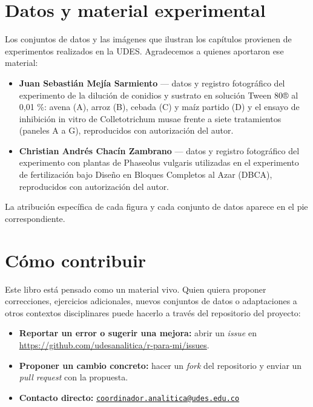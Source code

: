 \documentclass[
  spanish,
  letterpaper,
  DIV=11,
  numbers=noendperiod]{scrreprt}
\providecommand{\tightlist}{%
  \setlength{\itemsep}{0pt}\setlength{\parskip}{0pt}}
\begin{document}
\section*{Datos y material
experimental}\label{datos-y-material-experimental}


Los conjuntos de datos y las imágenes que ilustran los capítulos
provienen de experimentos realizados en la UDES. Agradecemos a quienes
aportaron ese material:

\begin{itemize}
\tightlist
\item
  \textbf{Juan Sebastián Mejía Sarmiento} --- datos y registro
  fotográfico del experimento de la dilución de conidios y sustrato en
  solución Tween 80® al 0,01 \%: avena (A), arroz (B), cebada (C) y maíz
  partido (D) y el ensayo de inhibición in vitro de Colletotrichum musae
  frente a siete tratamientos (paneles A a G), reproducidos con
  autorización del autor.
\item
  \textbf{Christian Andrés Chacín Zambrano} --- datos y registro
  fotográfico del experimento con plantas de Phaseolus vulgaris
  utilizadas en el experimento de fertilización bajo Diseño en Bloques
  Completos al Azar (DBCA), reproducidos con autorización del autor.
\end{itemize}

La atribución específica de cada figura y cada conjunto de datos aparece
en el pie correspondiente.

\section*{Cómo contribuir}\label{cuxf3mo-contribuir}


Este libro está pensado como un material vivo. Quien quiera proponer
correcciones, ejercicios adicionales, nuevos conjuntos de datos o
adaptaciones a otros contextos disciplinares puede hacerlo a través del
repositorio del proyecto:

\begin{itemize}
\tightlist
\item
  \textbf{Reportar un error o sugerir una mejora:} abrir un \emph{issue}
  en \url{https://github.com/udesanalitica/r-para-mi/issues}.
\item
  \textbf{Proponer un cambio concreto:} hacer un \emph{fork} del
  repositorio y enviar un \emph{pull request} con la propuesta.
\item
  \textbf{Contacto directo:}
  \href{mailto:coordinador.analitica@udes.edu.co}{\nolinkurl{coordinador.analitica@udes.edu.co}}
\end{itemize}
\end{document}

